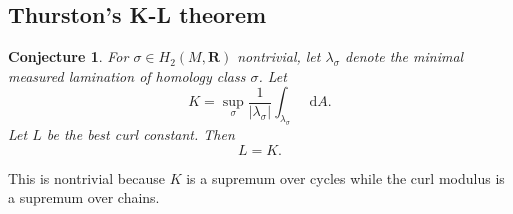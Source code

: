 \documentclass[reqno,11pt]{amsart}
\newcommand{\RR}{\mathbf{R}}
\newcommand*\dif{\mathop{}\!\mathrm{d}}
\newtheorem{conjecture}[theorem]{Conjecture}
\theoremstyle{definition}
\numberwithin{equation}{section}
\begin{document}
\subsection{Thurston's K-L theorem}
\begin{conjecture}
For $\sigma \in H_2(M, \RR)$ nontrivial, let $\lambda_\sigma$ denote the minimal measured lamination of homology class $\sigma$.
Let 
$$K = \sup_\sigma \frac{1}{|\lambda_\sigma|} \int_{\lambda_\sigma} \dif A.$$
Let $L$ be the best curl constant. Then 
$$L = K.$$
\end{conjecture}

This is nontrivial because $K$ is a supremum over cycles while the curl modulus is a supremum over chains.


\printbibliography
\end{document}
